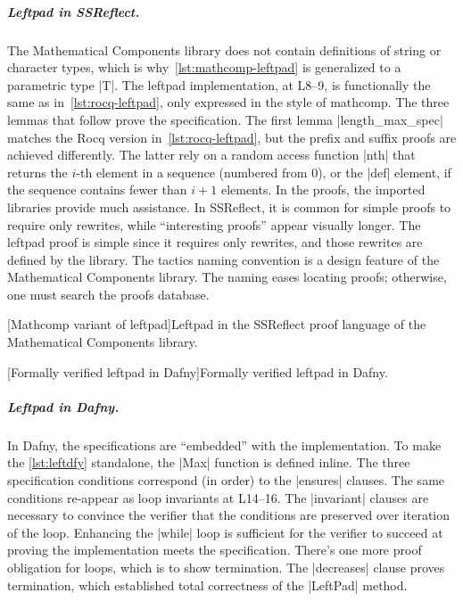 \subparagraph*{Leftpad in SSReflect.}
The Mathematical Components library does not contain definitions of string or character types,
which is why~\autoref{lst:mathcomp-leftpad} is generalized to a parametric type \pr|T|.
The leftpad implementation, at L8--9, is functionally the same as in~\autoref{lst:rocq-leftpad},
only expressed in the style of mathcomp.
The three lemmas that follow prove the specification.
The first lemma \pr|length_max_spec| matches the Rocq version in~\autoref{lst:rocq-leftpad},
but the prefix and suffix proofs are achieved differently.
The latter rely on a random access function \pr|nth| that returns the \(i\)-th element in a sequence
(numbered from 0), or the \pr|def| element, if the sequence contains fewer than \(i+1\) elements.
In the proofs, the imported libraries provide much assistance.
In SSReflect, it is common for simple proofs to require only rewrites, while \enquote{interesting proofs} appear visually longer.
The leftpad proof is simple since it requires only rewrites, and those rewrites are defined by the library.
The tactics naming convention is a design feature of the Mathematical Components library.
The naming eases locating proofs;
otherwise, one must search the proofs database.

\begin{center}
\captionsetup{type=lstlisting}
\begin{minipage}{\linewidth}
[Mathcomp variant of leftpad]{Leftpad in the SSReflect proof language of the Mathematical Components library.}
\label{lst:mathcomp-leftpad}
\end{minipage}
\end{center}

\begin{center}
\begin{minipage}{\linewidth}
\captionsetup{type=lstlisting}
[Formally verified leftpad in Dafny]{Formally verified leftpad in Dafny.}
\label{lst:leftdfy}
\end{minipage}
\end{center}

\subparagraph*{Leftpad in Dafny.}
In Dafny, the specifications are \enquote{embedded} with the implementation.
To make the \autoref{lst:leftdfy} standalone, the \pr|Max| function is defined inline.
The three specification conditions correspond (in order) to the \pr|ensures| clauses.
The same conditions re-appear as loop invariants at L14--16.
The \pr|invariant| clauses are necessary to convince the verifier that the conditions are preserved over iteration of the loop.
Enhancing the \pr|while| loop is sufficient for the verifier to succeed at proving the implementation meets the specification.
There's one more proof obligation for loops, which is to show termination.
The \pr|decreases| clause proves termination, which established total correctness of the \pr|LeftPad| method.

